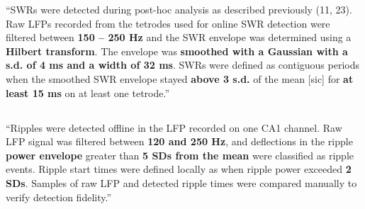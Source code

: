 \begin{quotebar}
``SWRs were detected during post-hoc analysis as described previously (11, 23). Raw LFPs recorded from the tetrodes used for online SWR detection were filtered between \textbf{150 – 250 Hz} and the SWR envelope was determined using a \textbf{Hilbert transform}. The envelope was \textbf{smoothed with a Gaussian with a s.d. of 4 ms and a width of 32 ms}. SWRs were defined as contiguous periods when the smoothed SWR envelope stayed \textbf{above 3 s.d.} of the mean [sic] for \textbf{at least 15 ms} on at least one tetrode.'' \cite{Jadhav2012}
\end{quotebar}


\subsection{}

\begin{quotebar}
``Ripples were detected offline in the LFP recorded on one CA1 channel. Raw LFP signal was filtered between \textbf{120 and 250 Hz}, and deflections in the ripple \textbf{power envelope} greater than \textbf{5 SDs from the mean} were classified as ripple events. Ripple start times were defined locally as when ripple power exceeded \textbf{2 SDs}. Samples of raw LFP and detected ripple times were compared manually to verify detection fidelity.'' \cite{Sadowski2016}
\end{quotebar}


\subsection{}

